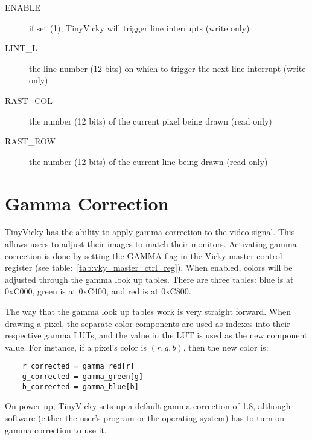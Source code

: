 \begin{description}
    \item[ENABLE] if set (1), TinyVicky will trigger line interrupts (write only)

    \item[LINT\_L] the line number (12 bits) on which to trigger the next line interrupt (write only)

    \item[RAST\_COL] the number (12 bits) of the current pixel being drawn (read only)

    \item[RAST\_ROW] the number (12 bits) of the current line being drawn (read only)
\end{description}

\section{Gamma Correction}

TinyVicky has the ability to apply gamma correction to the video signal. This allows users to adjust their images to match their monitors. Activating gamma correction is done by setting the GAMMA flag in the Vicky master control register (see table:~\ref{tab:vky_master_ctrl_reg}). When enabled, colors will be adjusted through the gamma look up tables. There are three tables: blue is at 0xC000, green is at 0xC400, and red is at 0xC800.

The way that the gamma look up tables work is very straight forward. When drawing a pixel, the separate color components are used as indexes into their respective gamma LUTs, and the value in the LUT is used as the new component value. For instance, if a pixel's color is $(r, g, b)$, then the new color is:
\begin{verbatim}
    r_corrected = gamma_red[r]
    g_corrected = gamma_green[g]
    b_corrected = gamma_blue[b]
\end{verbatim}

On power up, TinyVicky sets up a default gamma correction of 1.8, although software (either the user's program or the operating system) has to turn on gamma correction to use it.
